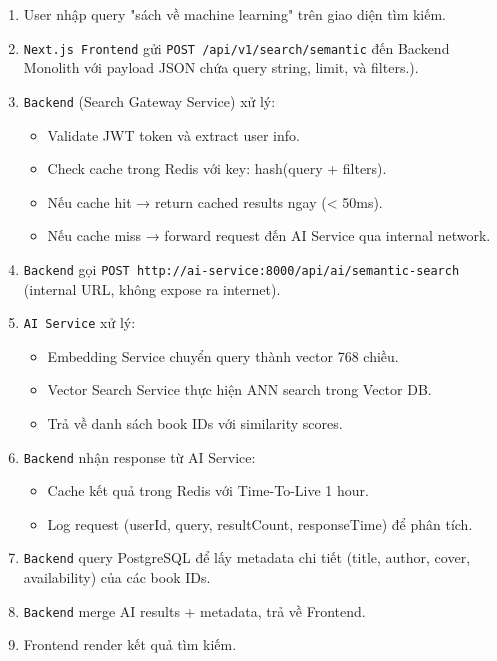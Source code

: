 \begin{enumerate}
    \item User nhập query "sách về machine learning" trên giao diện tìm kiếm.
    
    \item \texttt{Next.js Frontend} gửi \texttt{POST /api/v1/search/semantic} đến Backend Monolith với payload JSON chứa query string, limit, và filters.).
    
   \item \texttt{Backend} (Search Gateway Service) xử lý:
    \begin{itemize}
        \item Validate JWT token và extract user info.
        \item Check cache trong Redis với key: hash(query + filters).
        \item Nếu cache hit → return cached results ngay (< 50ms).
        \item Nếu cache miss → forward request đến AI Service qua internal network.
    \end{itemize}
    
    \item \texttt{Backend} gọi \texttt{POST http://ai-service:8000/api/ai/semantic-search} 
    (internal URL, không expose ra internet).
    
    \item \texttt{AI Service} xử lý:
    \begin{itemize}
        \item Embedding Service chuyển query thành vector 768 chiều.
        \item Vector Search Service thực hiện ANN search trong Vector DB.
        \item Trả về danh sách book IDs với similarity scores.
    \end{itemize}
    
    \item \texttt{Backend} nhận response từ AI Service:
    \begin{itemize}
        \item Cache kết quả trong Redis với Time-To-Live 1 hour.
        \item Log request (userId, query, resultCount, responseTime) để phân tích.
    \end{itemize}
    
    \item \texttt{Backend} query PostgreSQL để lấy metadata chi tiết 
    (title, author, cover, availability) của các book IDs.
    
    \item \texttt{Backend} merge AI results + metadata, trả về Frontend.
    
    \item Frontend render kết quả tìm kiếm.
\end{enumerate}

